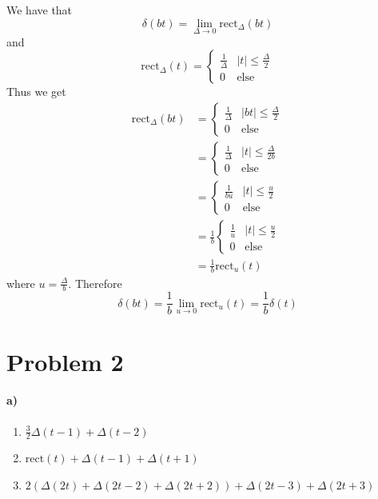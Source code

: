 \documentclass[12pt]{article}
\begin{document}
We have that
\[\delta(bt)=\lim_{\Delta\to 0} \text{rect}_{\Delta}(bt)\]
and
\[
    \text{rect}_{\Delta}(t)=
    \begin{cases}
        \frac{1}{\Delta} & |t|\leq\frac{\Delta}{2}\\
        0 & \text{else}
    \end{cases}
\]
Thus we get
\begin{align*}
    \text{rect}_{\Delta}(bt)&=
    \begin{cases}
        \frac{1}{\Delta} & |bt|\leq\frac{\Delta}{2}\\
        0 & \text{else}
    \end{cases}\\
    &=
    \begin{cases}
        \frac{1}{\Delta} & |t|\leq\frac{\Delta}{2b}\\
        0 & \text{else}
    \end{cases}\\
    &=
    \begin{cases}
        \frac{1}{bu} & |t|\leq\frac{u}{2}\\
        0 & \text{else}
    \end{cases}\\
    &=
    \frac{1}{b}
    \begin{cases}
        \frac{1}{u} & |t|\leq\frac{u}{2}\\
        0 & \text{else}
    \end{cases}\\
    &=\frac{1}{b}\text{rect}_u(t)
\end{align*}
where \(u=\frac{\Delta}{b}\). Therefore
\[\delta(bt)=\frac{1}{b}\lim_{u\to 0} \text{rect}_{u}(t)=\frac{1}{b}\delta(t)\]

\section*{Problem 2}

\paragraph{a)}

\begin{enumerate}
    \item \(\frac{3}{2}\Delta(t-1) + \Delta(t-2)\)
    \item \(\text{rect}(t)+\Delta(t-1)+\Delta(t+1)\)
    \item \(2(\Delta(2t)+\Delta(2t-2)+\Delta(2t+2))+\Delta(2t-3)+\Delta(2t+3)\)
\end{enumerate}
\end{document}
